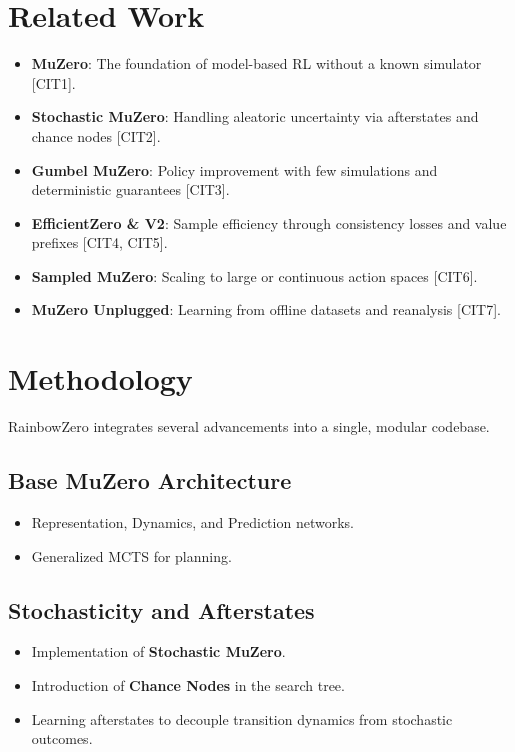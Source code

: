 \documentclass[twocolumn,10pt]{article}
\begin{document}
\section{Related Work}
\begin{itemize}
    \item \textbf{MuZero}: The foundation of model-based RL without a known simulator [CIT1].
    \item \textbf{Stochastic MuZero}: Handling aleatoric uncertainty via afterstates and chance nodes [CIT2].
    \item \textbf{Gumbel MuZero}: Policy improvement with few simulations and deterministic guarantees [CIT3].
    \item \textbf{EfficientZero \& V2}: Sample efficiency through consistency losses and value prefixes [CIT4, CIT5].
    \item \textbf{Sampled MuZero}: Scaling to large or continuous action spaces [CIT6].
    \item \textbf{MuZero Unplugged}: Learning from offline datasets and reanalysis [CIT7].
\end{itemize}

\section{Methodology}
RainbowZero integrates several advancements into a single, modular codebase.

\subsection{Base MuZero Architecture}
\begin{itemize}
    \item Representation, Dynamics, and Prediction networks.
    \item Generalized MCTS for planning.
\end{itemize}

\subsection{Stochasticity and Afterstates}
\begin{itemize}
    \item Implementation of \textbf{Stochastic MuZero}.
    \item Introduction of \textbf{Chance Nodes} in the search tree.
    \item Learning afterstates to decouple transition dynamics from stochastic outcomes.
\end{itemize}
\end{document}
